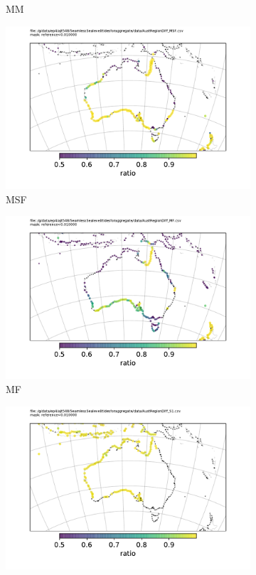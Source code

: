 \begin{figure}[H]
\begin{subfigure}[b]{\figwidthHalf}
        \caption{MM}
    \end{subfigure}
    \begin{subfigure}[b]{\figwidthHalf}
        \includegraphics[width=\textwidth]{figures/maps/AustRegionDiff_MSF.pdf}
        \caption{MSF}
    \end{subfigure}
    \begin{subfigure}[b]{\figwidthHalf}
        \includegraphics[width=\textwidth]{figures/maps/AustRegionDiff_MF.pdf}
        \caption{MF}
    \end{subfigure}
    \begin{subfigure}[b]{\figwidthHalf}
        \includegraphics[width=\textwidth]{figures/maps/AustRegionDiff_S1.pdf}

\end{subfigure}
\end{figure}
